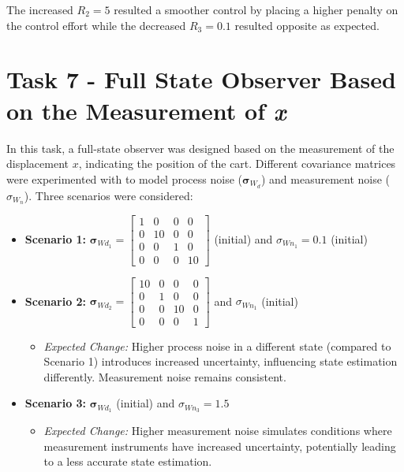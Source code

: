 \documentclass[12pt]{article}
\begin{document}
\noindent The increased $R_2 = 5$ resulted a smoother control by placing a higher penalty on the control effort while the decreased $R_3 = 0.1$ resulted opposite as expected.

\section*{Task 7 - Full State Observer Based on the Measurement of \textit{x}}
In this task, a full-state observer was designed based on the measurement of the displacement \(x\), indicating the position of the cart. Different covariance matrices were experimented with to model process noise (\(\mathbf{\sigma}_{W_d}\)) and measurement noise (\(\sigma_{W_n}\)). Three scenarios were considered:

\begin{itemize}
  \item \textbf{Scenario 1:} $\mathbf{\sigma}_{Wd_1} = \begin{bmatrix}
    1 & 0 & 0 & 0 \\
    0 & 10 & 0 & 0 \\
    0 & 0 & 1 & 0 \\
    0 & 0 & 0 & 10 \end{bmatrix}$ (initial) and $\sigma_{Wn_1} = 0.1$ (initial)

  \item \textbf{Scenario 2:} $\mathbf{\sigma}_{Wd_2} = \begin{bmatrix}
    10 & 0 & 0 & 0 \\
    0 & 1 & 0 & 0 \\
    0 & 0 & 10 & 0 \\
    0 & 0 & 0 & 1 \end{bmatrix}$ and \(\sigma_{Wn_1}\) (initial)
    \begin{itemize}
      \item \textit{Expected Change:} Higher process noise in a different state (compared to Scenario 1) introduces increased uncertainty, influencing state estimation differently. Measurement noise remains consistent.
    \end{itemize}

  \item \textbf{Scenario 3:} \(\mathbf{\sigma}_{Wd_1}\) (initial) and $\sigma_{Wn_3} = 1.5$
    \begin{itemize}
      \item \textit{Expected Change:} Higher measurement noise simulates conditions where measurement instruments have increased uncertainty, potentially leading to a less accurate state estimation.
    \end{itemize}
\end{itemize}
\end{document}
